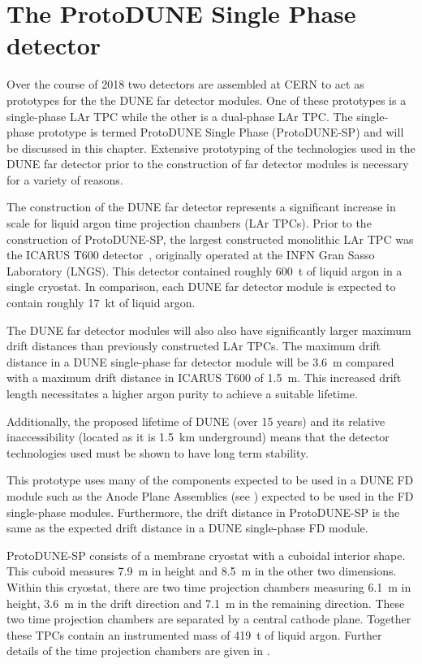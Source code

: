 \chapter{The ProtoDUNE Single Phase detector}
\label{sec:protodune}

Over the course of 2018 two detectors are assembled at CERN to act as prototypes for the the DUNE far detector modules.
One of these prototypes is a single-phase LAr TPC while the other is a dual-phase LAr TPC.
The single-phase prototype is termed ProtoDUNE Single Phase (ProtoDUNE-SP) and will be discussed in this chapter.
Extensive prototyping of the technologies used in the DUNE far detector prior to the construction of far detector modules is necessary for a variety of reasons.

The construction of the DUNE far detector represents a significant increase in scale for liquid argon time projection chambers (LAr TPCs).
Prior to the construction of ProtoDUNE-SP, the largest constructed monolithic LAr TPC was the ICARUS T600 detector~\cite{icarus}, originally operated at the INFN Gran Sasso Laboratory (LNGS).
This detector contained roughly \SI{600}{\tonne} of liquid argon in a single cryostat.
In comparison, each DUNE far detector module is expected to contain roughly \SI{17}{\kilo\tonne} of liquid argon.

The DUNE far detector modules will also also have significantly larger maximum drift distances than previously constructed LAr TPCs.
The maximum drift distance in a DUNE single-phase far detector module will be \SI{3.6}{\m} compared with a maximum drift distance in ICARUS T600 of \SI{1.5}{\m}.
This increased drift length necessitates a higher argon purity to achieve a suitable lifetime.

Additionally, the proposed lifetime of DUNE (over 15 years) and its relative inaccessibility (located as it is \SI{1.5}{\kilo\metre} underground) means that the detector technologies used must be shown to have long term stability.

This prototype uses many of the components expected to be used in a DUNE FD module such as the Anode Plane Assemblies (see ) expected to be used in the FD single-phase modules.
Furthermore, the drift distance in ProtoDUNE-SP is the same as the expected drift distance in a DUNE single-phase FD module.

ProtoDUNE-SP consists of a membrane cryostat with a cuboidal interior shape.
This cuboid measures \SI{7.9}{\m} in height and \SI{8.5}{\m} in the other two dimensions.
Within this cryostat, there are two time projection chambers measuring \SI{6.1}{\m} in height, \SI{3.6}{\m} in the drift direction and \SI{7.1}{\m} in the remaining direction.
These two time projection chambers are separated by a central cathode plane.
Together these TPCs contain an instrumented mass of \SI{419}{\tonne} of liquid argon.
Further details of the time projection chambers are given in .

